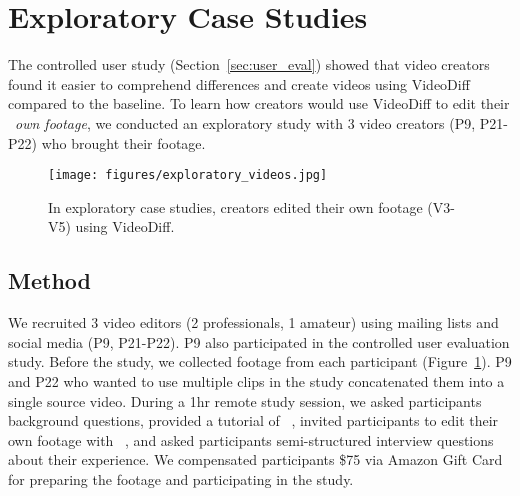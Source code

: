 \section{Exploratory Case Studies}
The controlled user study (Section~\ref{sec:user_eval}) showed that video creators found it easier to comprehend differences and create videos using VideoDiff compared to the baseline. To learn how creators would use VideoDiff to edit their ~\textit{own footage}, we conducted an exploratory study with 3 video creators (P9, P21-P22) who brought their footage. 


\begin{figure}[t]
  \centering
  \texttt{[image: figures/exploratory\_videos.jpg]}
  \caption{In exploratory case studies, creators edited their own footage (V3-V5) using VideoDiff.}\label{fig:exploratory_videos}
\end{figure}


\subsection{Method}
We recruited 3 video editors (2 professionals, 1 amateur) using mailing lists and social media (P9, P21-P22). P9 also participated in the controlled user evaluation study. Before the study, we collected footage from each participant (Figure~\ref{fig:exploratory_videos}). P9 and P22 who wanted to use multiple clips in the study concatenated them into a single source video.
During a 1hr remote study session, we asked participants background questions, provided a tutorial of ~\sysname{}, invited participants to edit their own footage with ~\sysname{}, and asked participants semi-structured interview questions about their experience. We compensated participants \$75 via Amazon Gift Card for preparing the footage and participating in the study.


